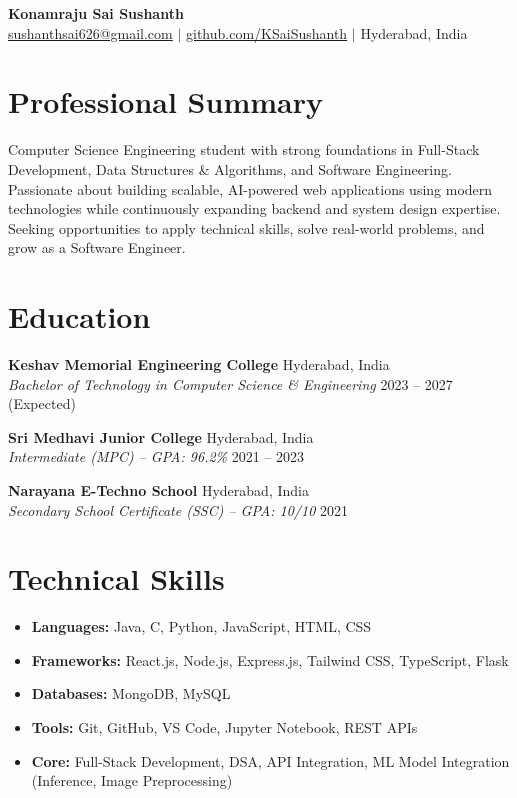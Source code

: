 \documentclass[10pt,a4paper]{article}
\begin{document}
\begin{center}
    {\LARGE \bfseries Konamraju Sai Sushanth} \\[4pt]
    \small
    \href{mailto:sushanthsai626@gmail.com}{sushanthsai626@gmail.com} \enspace $|$ \enspace
    \href{https://github.com/KSaiSushanth}{github.com/KSaiSushanth} \enspace $|$ \enspace
    Hyderabad, India
\end{center}

\section*{Professional Summary}
Computer Science Engineering student with strong foundations in Full-Stack Development, Data Structures \& Algorithms, and Software Engineering. Passionate about building scalable, AI-powered web applications using modern technologies while continuously expanding backend and system design expertise. Seeking opportunities to apply technical skills, solve real-world problems, and grow as a Software Engineer.

\section*{Education}
\textbf{Keshav Memorial Engineering College} \hfill Hyderabad, India \\
\textit{Bachelor of Technology in Computer Science \& Engineering} \hfill 2023 -- 2027 (Expected)

\vspace{5pt}

\textbf{Sri Medhavi Junior College} \hfill Hyderabad, India \\
\textit{Intermediate (MPC) -- GPA: 96.2\%} \hfill 2021 -- 2023

\vspace{5pt}

\textbf{Narayana E-Techno School} \hfill Hyderabad, India \\
\textit{Secondary School Certificate (SSC) -- GPA: 10/10} \hfill 2021

\section*{Technical Skills}
\begin{itemize}[label=$\circ$]
    \item \textbf{Languages:} Java, C, Python, JavaScript, HTML, CSS
    \item \textbf{Frameworks:} React.js, Node.js, Express.js, Tailwind CSS, TypeScript, Flask
    \item \textbf{Databases:} MongoDB, MySQL
    \item \textbf{Tools:} Git, GitHub, VS Code, Jupyter Notebook, REST APIs
    \item \textbf{Core:} Full-Stack Development, DSA, API Integration, ML Model Integration (Inference, Image Preprocessing)
\end{itemize}
\end{document}
